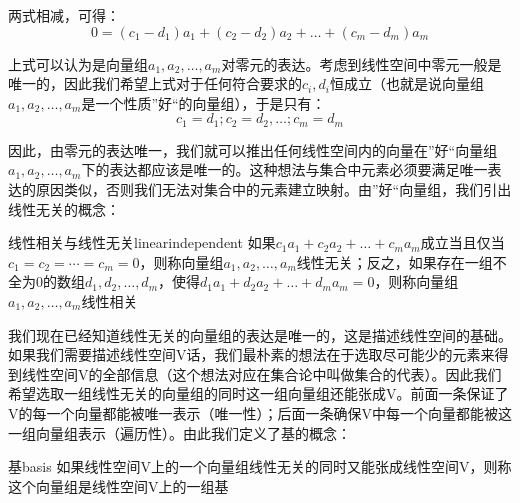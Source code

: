         两式相减，可得：
            \begin{equation}
                0=(c_1-d_1)a_1+(c_2-d_2)a_2+\ldots +(c_m-d_m)a_m
            \end{equation}
        
        上式可以认为是向量组$a_1,a_2,\ldots,a_m $对零元的表达。考虑到线性空间中零元一般是唯一的，因此我们希望上式对于任何符合要求的$c_i,d_i$恒成立（也就是说向量组$a_1,a_2,\ldots,a_m $是一个性质”好“的向量组），于是只有：
            \begin{equation}
               c_1=d_1;c_2=d_2,\ldots;c_m=d_m
            \end{equation}
            
        因此，由零元的表达唯一，我们就可以推出任何线性空间内的向量在”好“向量组$a_1,a_2,\ldots,a_m $下的表达都应该是唯一的。这种想法与集合中元素必须要满足唯一表达的原因类似，否则我们无法对集合中的元素建立映射。由”好“向量组，我们引出线性无关的概念：
        \begin{definition}{线性相关与线性无关}{linearindependent}
        如果$c_1a_1+c_2a_2+\ldots +c_ma_m$成立当且仅当$c_1=c_2=\cdots=c_m=0$，则称向量组$a_1,a_2,\ldots,a_m$线性无关；反之，如果存在一组不全为0的数组$d_1,d_2,\ldots ,d_m$，使得$d_1a_1+d_2a_2+\ldots +d_ma_m=0$，则称向量组$a_1,a_2,\ldots,a_m$线性相关
        \end{definition}
        
        我们现在已经知道线性无关的向量组的表达是唯一的，这是描述线性空间的基础。如果我们需要描述线性空间V话，我们最朴素的想法在于选取尽可能少的元素来得到线性空间V的全部信息（这个想法对应在集合论中叫做集合的代表）。因此我们希望选取一组线性无关的向量组的同时这一组向量组还能张成V。前面一条保证了V的每一个向量都能被唯一表示（唯一性）；后面一条确保V中每一个向量都能被这一组向量组表示（遍历性）。由此我们定义了基的概念：
        \begin{definition}{基}{basis}
        如果线性空间V上的一个向量组线性无关的同时又能张成线性空间V，则称这个向量组是线性空间V上的一组基
        \end{definition}
        
